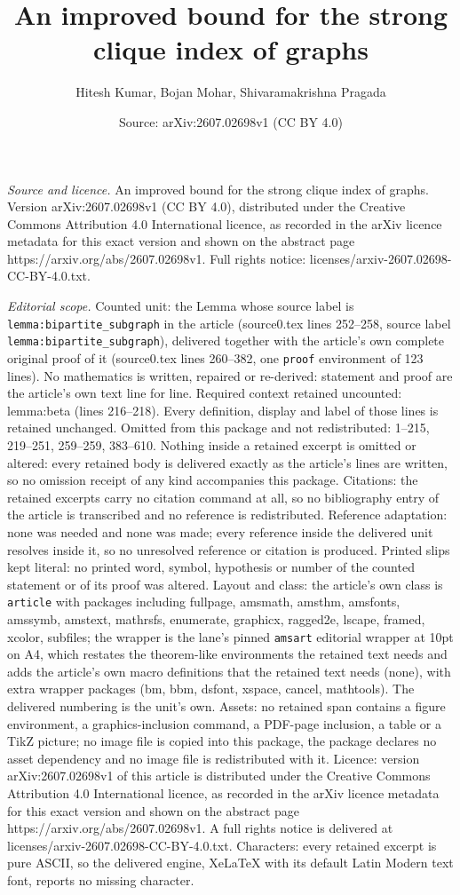 \documentclass[10pt,a4paper]{amsart}
\title[An improved bound for the strong clique index of graphs]{An improved bound for the strong clique index of graphs}
\author{Hitesh Kumar, Bojan Mohar, Shivaramakrishna Pragada}
\date{Source: arXiv:2607.02698v1 (CC BY 4.0)}
\begin{document}
\maketitle

\noindent\emph{Source and licence.} An improved bound for the strong clique index of graphs. Version arXiv:2607.02698v1 (CC BY 4.0), distributed under the Creative Commons Attribution 4.0 International licence, as recorded in the arXiv licence metadata for this exact version and shown on the abstract page https://arxiv.org/abs/2607.02698v1. Full rights notice: licenses/arxiv-2607.02698-CC-BY-4.0.txt.\par\smallskip

\noindent\textit{Editorial scope.} Counted unit: the Lemma whose source label is \texttt{lemma:bipartite\_subgraph} in the article (source0.tex lines 252--258, source label \texttt{lemma:bipartite\_subgraph}), delivered together with the article's own complete original proof of it (source0.tex lines 260--382, one \texttt{proof} environment of 123 lines). No mathematics is written, repaired or re-derived: statement and proof are the article's own text line for line. Required context retained uncounted: lemma:beta (lines 216--218). Every definition, display and label of those lines is retained unchanged. Omitted from this package and not redistributed: 1--215, 219--251, 259--259, 383--610. Nothing inside a retained excerpt is omitted or altered: every retained body is delivered exactly as the article's lines are written, so no omission receipt of any kind accompanies this package. Citations: the retained excerpts carry no citation command at all, so no bibliography entry of the article is transcribed and no reference is redistributed. Reference adaptation: none was needed and none was made; every reference inside the delivered unit resolves inside it, so no unresolved reference or citation is produced. Printed slips kept literal: no printed word, symbol, hypothesis or number of the counted statement or of its proof was altered. Layout and class: the article's own class is \texttt{article} with packages including fullpage, amsmath, amsthm, amsfonts, amssymb, amstext, mathrsfs, enumerate, graphicx, ragged2e, lscape, framed, xcolor, subfiles; the wrapper is the lane's pinned \texttt{amsart} editorial wrapper at 10pt on A4, which restates the theorem-like environments the retained text needs and adds the article's own macro definitions that the retained text needs (none), with extra wrapper packages (bm, bbm, dsfont, xspace, cancel, mathtools). The delivered numbering is the unit's own. Assets: no retained span contains a figure environment, a graphics-inclusion command, a PDF-page inclusion, a table or a TikZ picture; no image file is copied into this package, the package declares no asset dependency and no image file is redistributed with it. Licence: version arXiv:2607.02698v1 of this article is distributed under the Creative Commons Attribution 4.0 International licence, as recorded in the arXiv licence metadata for this exact version and shown on the abstract page https://arxiv.org/abs/2607.02698v1. A full rights notice is delivered at licenses/arxiv-2607.02698-CC-BY-4.0.txt. Characters: every retained excerpt is pure ASCII, so the delivered engine, XeLaTeX with its default Latin Modern text font, reports no missing character.
\end{document}
